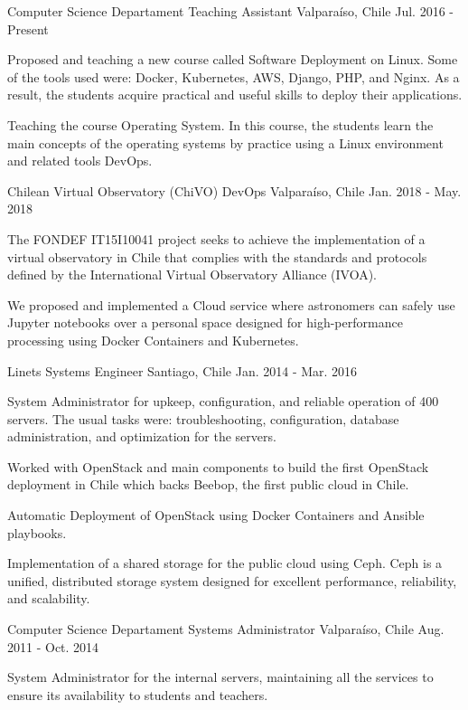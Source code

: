 \begin{cventries}
  \cventry
    {Computer Science Departament}
    {Teaching Assistant}
    {Valparaíso, Chile}
    {Jul. 2016 - Present}
    {
      \begin{cvitems}
        \item {Proposed and teaching a new course called Software Deployment on Linux. Some of the tools used were: Docker, Kubernetes, AWS, Django, PHP, and Nginx. As a result, the students acquire practical and useful skills to deploy their applications.}
        \item {Teaching the course Operating System. In this course, the students learn the main concepts of the operating systems by practice using a Linux environment and related tools DevOps.}
      \end{cvitems}
    }
    
    
  \cventry
    {Chilean Virtual Observatory (ChiVO)}
    {DevOps}
    {Valparaíso, Chile}
    {Jan. 2018 - May. 2018}
    {
      \begin{cvitems}
        \item {The FONDEF IT15I10041 project seeks to achieve the implementation of a virtual observatory in Chile that complies with the standards and protocols defined by the International Virtual Observatory Alliance (IVOA).}
        \item {We proposed and implemented a Cloud service where astronomers can safely use Jupyter notebooks over a personal space designed for high-performance processing using Docker Containers and Kubernetes.}
      \end{cvitems}
    }
    

  \cventry
    {Linets}
    {Systems Engineer}    
    {Santiago, Chile}
    {Jan. 2014 - Mar. 2016}
    {
      \begin{cvitems}
        \item {System Administrator for upkeep, configuration, and reliable operation of 400 servers. The usual tasks were: troubleshooting, configuration, database administration, and optimization for the servers.}
        \item {Worked with OpenStack and main components to build the first OpenStack deployment in Chile which backs Beebop, the first public cloud in Chile.}
        \item {Automatic Deployment of OpenStack using Docker Containers and Ansible playbooks.}
        \item {Implementation of a shared storage for the public cloud using Ceph. Ceph is a unified, distributed storage system designed for excellent performance, reliability, and scalability.}
      \end{cvitems}
    }
    
  \cventry
    {Computer Science Departament}
    {Systems Administrator}    
    {Valparaíso, Chile}
    {Aug. 2011 - Oct. 2014}
    {
      \begin{cvitems}
		\item{System Administrator for the internal servers, maintaining all the services to ensure its availability to students and teachers.}
      \end{cvitems}
    }    
\end{cventries}
